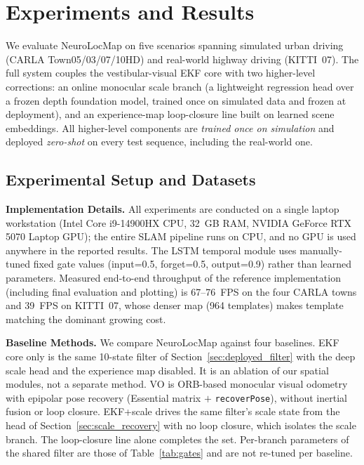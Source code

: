 
\section{Experiments and Results}
\label{sec:experiments}

We evaluate NeuroLocMap on five scenarios spanning simulated urban driving (CARLA Town05/03/07/10HD) and real-world highway driving (KITTI~07). The full system couples the vestibular-visual EKF core with two higher-level corrections: an online monocular scale branch (a lightweight regression head over a frozen depth foundation model, trained once on simulated data and frozen at deployment), and an experience-map loop-closure line built on learned scene embeddings. All higher-level components are \emph{trained once on simulation} and deployed \emph{zero-shot} on every test sequence, including the real-world one.

\subsection{Experimental Setup and Datasets}

\textbf{Implementation Details.} All experiments are conducted on a single laptop workstation (Intel Core i9-14900HX CPU, 32~GB RAM, NVIDIA GeForce RTX 5070 Laptop GPU); the entire SLAM pipeline runs on CPU, and no GPU is used anywhere in the reported results. The LSTM temporal module uses manually-tuned fixed gate values (input=0.5, forget=0.5, output=0.9) rather than learned parameters. Measured end-to-end throughput of the reference implementation (including final evaluation and plotting) is 67--76~FPS on the four CARLA towns and 39~FPS on KITTI~07, whose denser map (964 templates) makes template matching the dominant growing cost.

\textbf{Baseline Methods.} We compare NeuroLocMap against four baselines. EKF core only is the same 10-state filter of Section~\ref{sec:deployed_filter} with the deep scale head and the experience map disabled. It is an ablation of our spatial modules, not a separate method. VO is ORB-based monocular visual odometry with epipolar pose recovery (Essential matrix $+$ \texttt{recoverPose}), without inertial fusion or loop closure. EKF+scale drives the same filter's scale state from the head of Section~\ref{sec:scale_recovery} with no loop closure, which isolates the scale branch. The loop-closure line alone completes the set. Per-branch parameters of the shared filter are those of Table~\ref{tab:gates} and are not re-tuned per baseline.

